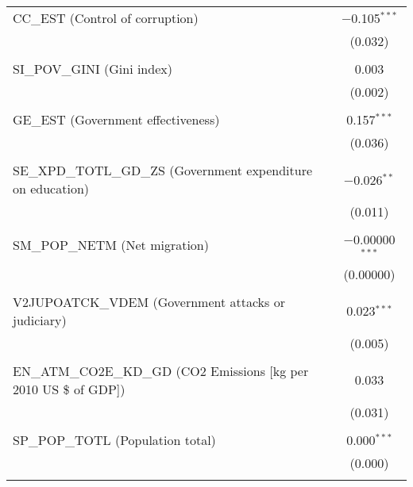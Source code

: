 \documentclass[a4paper]{article}
\begin{document}
\begin{table}[!htbp]
\begin{tabular}{@{\extracolsep{5pt}}lc}
 CC\_EST (Control of corruption) & $-$0.105$^{***}$ \\

  & (0.032) \\

  & \\

 SI\_POV\_GINI (Gini index) & 0.003 \\

  & (0.002) \\

  & \\

 GE\_EST (Government effectiveness) & 0.157$^{***}$ \\

  & (0.036) \\

  & \\

 SE\_XPD\_TOTL\_GD\_ZS (Government expenditure on education) & $-$0.026$^{**}$ \\

  & (0.011) \\

  & \\

 SM\_POP\_NETM (Net migration) & $-$0.00000$^{***}$ \\

  & (0.00000) \\

  & \\

 V2JUPOATCK\_VDEM (Government attacks or judiciary) & 0.023$^{***}$ \\

  & (0.005) \\

  & \\

 EN\_ATM\_CO2E\_KD\_GD (CO2 Emissions [kg per 2010 US \$ of GDP]) & 0.033 \\

  & (0.031) \\

  & \\

 SP\_POP\_TOTL (Population total) & 0.000$^{***}$ \\

  & (0.000) \\

  & \\


\end{tabular}
\end{table}
\end{document}
